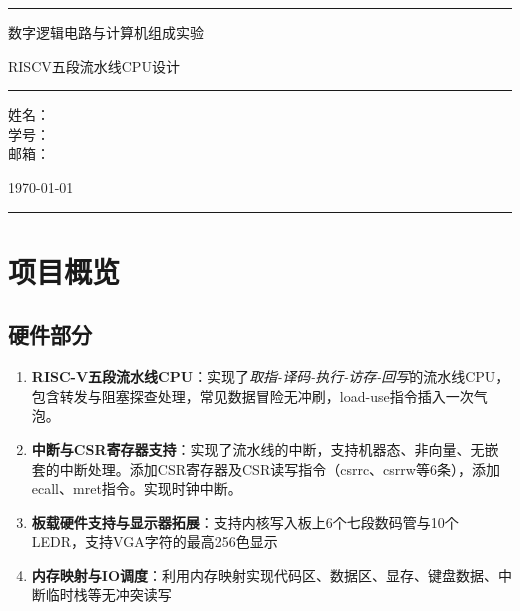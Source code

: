 \documentclass[]{article}
\begin{document}
  \begin{titlepage}
    \centering


    \rule{\textwidth}{1pt}   %
    
    \vspace{0.03\textheight}

    {\LARGE 数字逻辑电路与计算机组成实验}
    
    \vspace{0.015\textheight}
    {\Huge RISCV五段流水线CPU设计}

    \vspace{0.03\textheight}   

    \rule{0.83\textwidth}{0.4pt} 

    \vspace{0.1\textheight} 


    \begin{center}
            \Large 姓名：\ \ \underline{\makebox[200pt]{******}}\\
            \vspace{0.02\textheight}
            \Large 学号：\ \ \underline{\makebox[200pt]{******}}\\
            \vspace{0.02\textheight}
            \Large 邮箱：\ \ \underline{}
    \end{center}

    \vfill 

    {\large \today}
    \vspace{0.1\textheight} 


    \rule{\textwidth}{1pt} 

  \end{titlepage}
  
  
  \tableofcontents
  
  \newpage
  \section{项目概览}
  \subsection{硬件部分}
  \begin{enumerate}
      \item \textbf{RISC-V五段流水线CPU}：实现了\textit{取指-译码-执行-访存-回写}的流水线CPU，包含转发与阻塞探查处理，常见数据冒险无冲刷，load-use指令插入一次气泡。
      \item \textbf{中断与CSR寄存器支持}：实现了流水线的中断，支持机器态、非向量、无嵌套的中断处理。添加CSR寄存器及CSR读写指令（csrrc、csrrw等6条），添加ecall、mret指令。实现时钟中断。
      \item \textbf{板载硬件支持与显示器拓展}：支持内核写入板上6个七段数码管与10个LEDR，支持VGA字符的最高256色显示
      \item \textbf{内存映射与IO调度}：利用内存映射实现代码区、数据区、显存、键盘数据、中断临时栈等无冲突读写
  \end{enumerate}
\end{document}
